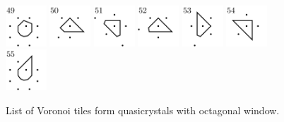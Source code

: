 \documentclass[text.tex]{subfiles}
\begin{document}
\begin{figure}[h!]
\includegraphics[width=0.1363\textwidth]{img/results/octagon_concat/octagon_100000_(1_0alpha_1)_049.pdf}
\includegraphics[width=0.1363\textwidth]{img/results/octagon_concat/octagon_100000_(1_0alpha_1)_050.pdf}
\includegraphics[width=0.1363\textwidth]{img/results/octagon_concat/octagon_100000_(1_0alpha_1)_051.pdf}
\includegraphics[width=0.1363\textwidth]{img/results/octagon_concat/octagon_100000_(1_0alpha_1)_052.pdf}
\includegraphics[width=0.1363\textwidth]{img/results/octagon_concat/octagon_100000_(1_0alpha_1)_053.pdf}
\includegraphics[width=0.1363\textwidth]{img/results/octagon_concat/octagon_100000_(1_0alpha_1)_054.pdf}
\includegraphics[width=0.1363\textwidth]{img/results/octagon_concat/octagon_100000_(1_0alpha_1)_055.pdf}

\caption{List of Voronoi tiles form quasicrystals with octagonal window. }
\label{fig_tiles1}
\end{figure}
\end{document}
